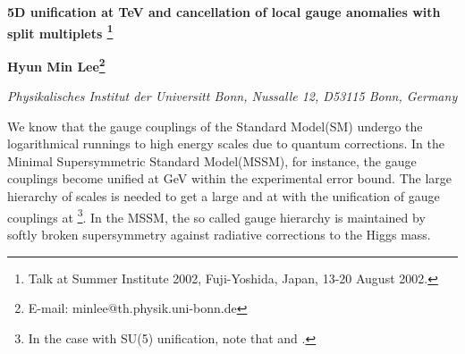 \documentclass[a4paper,11pt]{article}
\begin{document}
\baselineskip 0.6cm

\begin{center}
{\Large \bf 5D \coordHE{} unification at TeV and cancellation of local gauge
anomalies with split multiplets
\footnote{Talk at Summer Institute 2002, Fuji-Yoshida, Japan, 
13-20 August 2002.} }

\vskip 0.5cm

{\large \bf  Hyun Min Lee\footnote{E-mail: minlee@th.physik.uni-bonn.de} }

{\it Physikalisches Institut der Universit\coordHE{}t Bonn,
Nussalle 12, D53115 Bonn, Germany}

\vskip 0.5cm


\end{center}

\noindent
We know that the gauge couplings of the Standard Model(SM) undergo
the logarithmical runnings to high energy scales
due to quantum corrections.
In the Minimal Supersymmetric Standard Model(MSSM), for instance,
the gauge couplings become unified at \coordHE{} GeV within the
experimental error bound\cite{gut}.
The large hierarchy of scales is needed to get a large \coordHE{} and
\coordHE{}
at \coordHE{} with the unification of gauge couplings 
at \coordHE{}\footnote{In the case with SU(5) unification,
note that \coordHE{} and
\coordHE{}.}. In the MSSM, the so called gauge
hierarchy is maintained by softly broken supersymmetry against radiative 
corrections to the Higgs mass.
\end{document}
